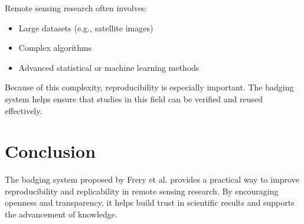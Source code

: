 \documentclass[12pt]{article}
\begin{document}
	Remote sensing research often involves:
	\begin{itemize}
		\item Large datasets (e.g., satellite images)
		\item Complex algorithms
		\item Advanced statistical or machine learning methods
	\end{itemize}
	
	Because of this complexity, reproducibility is especially important. The badging system helps ensure that studies in this field can be verified and reused effectively.
	
	\section{Conclusion}
	
	The badging system proposed by Frery et al. provides a practical way to improve reproducibility and replicability in remote sensing research. By encouraging openness and transparency, it helps build trust in scientific results and supports the advancement of knowledge.
	
\end{document}
